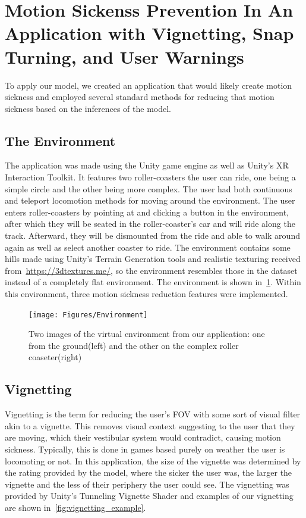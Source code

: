 \section{Motion Sickenss Prevention In An Application with Vignetting, Snap Turning, and User Warnings}
\label{sec:prevention}

To apply our model, we created an application that would likely create motion sickness and employed several standard methods for reducing that motion sickness based on the inferences of the model.

\subsection{The Environment}
\label{subsec:environment}

The application was made using the Unity game engine as well as Unity's XR Interaction Toolkit\cite{InteractionToolkit}.
It features two roller-coasters the user can ride, one being a simple circle and the other being more complex.
The user had both continuous and teleport locomotion methods for moving around the environment.
The user enters roller-coasters by pointing at and clicking a button in the environment, after which they will be seated in the roller-coaster's car and will ride along the track.
Afterward, they will be dismounted from the ride and able to walk around again as well as select another coaster to ride.
The environment contains some hills made using Unity's Terrain Generation tools and realistic texturing received from~\url{https://3dtextures.me/}\cite{3dtextures.me}, so the environment resembles those in the dataset instead of a completely flat environment.
The environment is shown in~\ref{fig:environment_images}.
Within this environment, three motion sickness reduction features were implemented.

\begin{figure}[h!]
    \texttt{[image: Figures/Environment]}
    \centering
    \caption{Two images of the virtual environment from our application: one from the ground(left) and the other on the complex roller coaseter(right)}
    \label{fig:environment_images}
\end{figure}

\subsection{Vignetting}
\label{subsec:vignetting}

Vignetting is the term for reducing the user's FOV with some sort of visual filter akin to a vignette.
This removes visual context suggesting to the user that they are moving, which their vestibular system would contradict, causing motion sickness.
Typically, this is done in games based purely on weather the user is locomoting or not.
In this application, the size of the vignette was determined by the rating provided by the model, where the sicker the user was, the larger the vignette and the less of their periphery the user could see.
The vignetting was provided by Unity's Tunneling Vignette Shader\cite{TunnelingVignette} and examples of our vignetting are shown in~\ref{fig:vignetting_example}.

